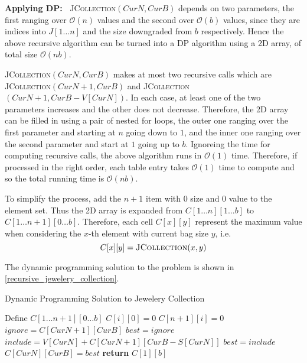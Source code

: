 \begin{homeworkProblem}
\vspace{1em}
\noindent
\textbf{Applying DP:\ }
\textsc{JCollection}$(CurN, CurB)$ depends on two parameters, the first
ranging over $\mathcal{O}(n)$ values and the second over $\mathcal{O}(b)$
values, since they are indices into $J[1\ldots n]$ and the size downgraded
from $b$ respectively. Hence the above recursive algorithm can be turned
into a DP algorithm using a 2D array, of total size $\mathcal{O}(nb)$.

\textsc{JCollection}$(CurN, CurB)$ makes at most two recursive calls 
which are \textsc{JCollection}$(CurN+1, CurB)$ and
\textsc{JCollection}$(CurN+1, CurB-V[CurN])$.
In each case, at least one of the two parameters increases and the
other does not decrease. Therefore, the 2D array can be filled in
using a pair of nested for loops, the outer one ranging over the
first parameter and starting at $n$ going down to $1$, and the inner
one ranging over the second parameter and start at $1$ going up
to $b$. Ignoreing the time for computing recursive calls, the above
algorithm runs in $\mathcal{O}(1)$ time. Therefore, if processed
in the right order, each table entry takes $\mathcal{O}(1)$ time to
compute and so the total running time is $\mathcal{O}(nb)$.

To simplify the process, add the $n+1$ item with $0$ size and $0$ value
to the element set. Thus the 2D array is expanded from $C[1\ldots n][1\ldots b]$ to $C[1\ldots n+1][0\ldots b]$.
Therefore, each cell $C[x][y]$ represent the maximum value when considering the
$x$-th element with current bag size $y$, i.e. 
\[C[x][y] = \text{\textsc{JCollection}}(x,y)\]

The dynamic programming solution to the problem is shown in \cref{recursive_jewelery_collection}.

\begin{algorithm}[H]
    \caption{Dynamic Programming Solution to Jewelery Collection}\label{dp_jewelery_collection}
    \begin{algorithmic}[1]
            \State Define $C[1\ldots n+1][0\ldots b]$
                \State $C[i][0] = 0$
            \EndFor
                \State $C[n+1][i] = 0$
            \EndFor
                    \State $ignore = C[CurN+1][CurB]$
                    \State $best = ignore$
                        \State $include = V[CurN] + C[CurN+1][CurB-S[CurN]]$
                            \State $best = include$
                        \EndIf
                    \EndIf
                    \State $C[CurN][CurB] = best$
                \EndFor
            \EndFor
            \State \textbf{return }$C[1][b]$
        \EndProcedure
    \end{algorithmic}
\end{algorithm}


\end{homeworkProblem}
